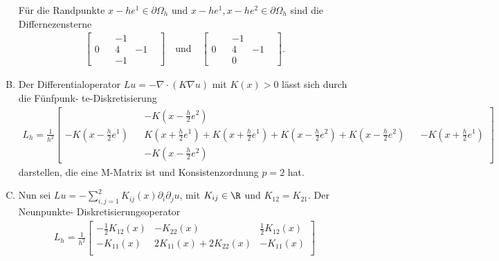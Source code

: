 \begin{Anwendung}
\begin{enumerate}[A)]
        Für die Randpunkte $x - h e^1 \in \partial\Omega_h$ und
        $x - h e^1, x - h e^2 \in \partial\Omega_h$ sind die Differnezensterne
        \begin{eqnarray*}
            \begin{bmatrix}
                & & -1 & & \\
                0 & & 4 & -1 \\
                & & -1 & &
            \end{bmatrix}
            \quad \text{und} \quad
            \begin{bmatrix}
                & & -1 & & \\
                0 & & 4 & -1 \\
                & & 0 & &
            \end{bmatrix}.
        \end{eqnarray*}
	\item
	    Der Differentialoperator $Lu = -\nabla \cdot (K \nabla u)$ mit
	    $K(x) > 0$ lässt sich durch die Fünfpunk- te-Diskretisierung
	    \begin{eqnarray*}
              L_h
            = \frac{1}{h^2} \left[
              \begin{smallmatrix}
                  & & -K\left(x - \frac{h}{2} e^2\right) & & \\
                  - K\left(x - \frac{h}{2} e^1\right) & &
                  K\left(x + \frac{h}{2} e^1\right)
                  + K\left(x + \frac{h}{2} e^1\right)
                  + K\left(x - \frac{h}{2} e^2\right)
                  + K\left(x - \frac{h}{2} e^2\right) & &
                  -K\left(x + \frac{h}{2} e^1\right) \\
                  & & -K\left(x - \frac{h}{2} e^2\right) & &
              \end{smallmatrix} \right]
	    \end{eqnarray*}
	    darstellen, die eine M-Matrix ist und Konsistenzordnung $p = 2$ hat.
	\item
	    Nun sei $Lu = - \sum_{i, j=1}^2 K_{ij}(x) \partial_i \partial_j u$,
	    mit $K_{ij} \in \R$ und $K_{12} = K_{21}$. Der Neunpunkte-
	    Diskretisierungsoperator
	    \begin{eqnarray*} 
              L_h
            = \frac{1}{h^2}
              \begin{bmatrix}
                  -\frac{1}{2} K_{12}(x) & -K_{22}(x) & \frac{1}{2} K_{12}(x) \\
                  -K_{11}(x) & 2 K_{11}(x) + 2 K_{22}(x) & - K_{11}(x) \\

\end{bmatrix}
\end{eqnarray*}
\end{enumerate}
\end{Anwendung}
